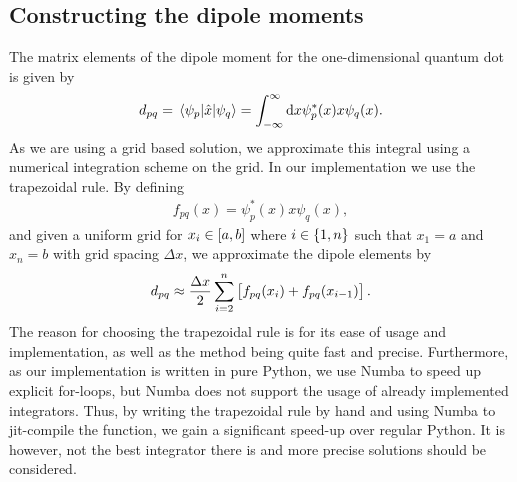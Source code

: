     \subsection{Constructing the dipole moments}
        The matrix elements of the dipole moment for the one-dimensional quantum
        dot is given by
        \begin{align}
            d_{pq}
            = \mel*{\psi_{p}}{\hat{x}}{\psi_{q}}
            = \int_{-\infty}^{\infty}\dd x
            \psi^{*}_{p}(x) x \psi_{q}(x).
        \end{align}
        As we are using a grid based solution, we approximate this integral
        using a numerical integration scheme on the grid.
        In our implementation we use the trapezoidal rule.
        By defining
        \begin{align}
            f_{pq}(x) = \psi^{*}_{p}(x) x \psi_{q}(x),
        \end{align}
        and given a uniform grid for $x_i \in \left[ a, b \right]$ where $i \in \left\{ 1,
        n \right\}$ such that $x_1 = a$ and $x_n = b$ with grid spacing $\Delta x$, we
        approximate the dipole elements by
        \begin{align}
            d_{pq}
            \approx
            \frac{\Delta x}{2}\sum_{i = 2}^{n}\left[ 
                f_{pq}(x_{i}) + f_{pq}(x_{i - 1})
             \right].
        \end{align}
        The reason for choosing the trapezoidal rule is for its ease of usage
        and implementation, as well as the method being quite fast and precise.
        Furthermore, as our implementation is written in pure Python, we use
        Numba \cite{numba} to speed up explicit for-loops, but Numba does not
        support the usage of already implemented integrators.
        Thus, by writing the trapezoidal rule by hand and using Numba to
        jit-compile the function, we gain a significant speed-up over regular
        Python.
        It is however, not the best integrator there is and more precise
        solutions should be considered.


